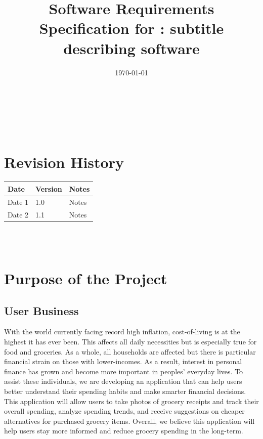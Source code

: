 \documentclass[12pt]{article}
\begin{document}
\title{Software Requirements Specification for \progname: subtitle describing software} 
\author{\authname}
\date{\today}
	
\maketitle

~\newpage


\tableofcontents

~\newpage

\section*{Revision History}

\begin{tabularx}{\textwidth}{p{3cm}p{2cm}X}
\toprule {\textbf{Date}} & {\textbf{Version}} & {\textbf{Notes}}\\
\midrule
Date 1 & 1.0 & Notes\\
Date 2 & 1.1 & Notes\\
\bottomrule
\end{tabularx}

~\\

~\newpage
\section{Purpose of the Project}
\subsection{User Business}

With the world currently facing record high inflation, cost-of-living is at the highest
it has ever been. This affects all daily necessities but is especially true for food and groceries.
As a whole, all households are affected but there is particular financial strain on those with lower-incomes.
As a result, interest in personal finance has grown and become more important in peoples' everyday lives.
To assist these individuals, we are developing an application that can help users better understand their
spending habits and make smarter financial decisions. This application will allow users to
take photos of grocery receipts and track their overall spending, analyze spending trends, and receive
suggestions on cheaper alternatives for purchased grocery items. Overall, we believe this application
will help users stay more informed and reduce grocery spending in the long-term.
\end{document}
